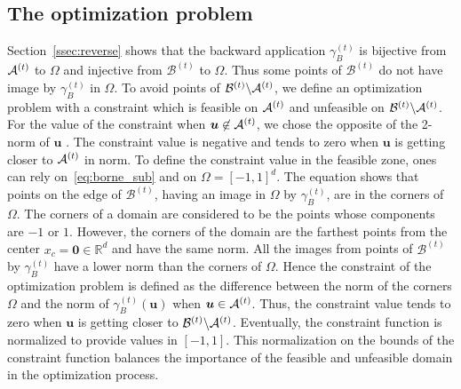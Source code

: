 \subsection{The optimization problem}
\label{ssec:sub_prob}

Section~\ref{ssec:reverse} shows that the backward application $\gamma_B^{(t)}$ is bijective from ${\mathcal{A}}^{(t)}$ to $\Omega$ and injective from $\mathcal{B}^{(t)}$ to $\Omega$. 
Thus some points of $\mathcal{B}^{(t)}$ do not have image by $\gamma_B^{(t)}$ in $\Omega$. 
To avoid points of $\mathcal{B}^{(t)} \backslash {\mathcal{A}}^{(t)}$, we define an optimization problem with a constraint which is feasible on ${\mathcal{A}}^{(t)}$ and unfeasible on $\mathcal{B}^{(t)} \backslash {\mathcal{A}}^{(t)}$.
For the value of the constraint when $\bm{u} \not\in {\mathcal{A}}^{(t)}$, we chose the opposite of the 2-norm of $\bm{u}$ .
The constraint value is negative and tends to zero when $\bm{u}$ is getting closer to ${\mathcal{A}}^{(t)}$ in norm.
To define the constraint value in the feasible zone, ones can rely on~\eqref{eq:borne_sub} and on $\Omega = [-1,1]^d$.
The equation shows that points on the edge of $\mathcal{B}^{(t)}$, having an image in $\Omega$ by $\gamma_B^{(t)}$, are in the corners of $\Omega$. 
The corners of a domain are considered to be the points whose components are $-1$ or $1$.
However, the corners of the domain are the farthest points from the center $x_c = \bm{0} \in \mathbb{R}^d$ and have the same norm. 
All the images from points of $\mathcal{B}^{(t)}$ by $\gamma_B^{(t)}$ have a lower norm than the corners of $\Omega$. 
Hence the constraint of the optimization problem is defined as the difference between the norm of the corners $\Omega$ and the norm of $\gamma_{B}^{(t)}(\bm{u})$ when $\bm{u} \in {\mathcal{A}}^{(t)}$.
Thus, the constraint value tends to zero when $\bm{u}$ is getting closer to $\mathcal{B}^{(t)} \backslash {\mathcal{A}}^{(t)}$.
Eventually, the constraint function is normalized to provide values in $[-1,1]$.
This normalization on the bounds of the constraint function balances the importance of the feasible and unfeasible domain in the optimization process.

